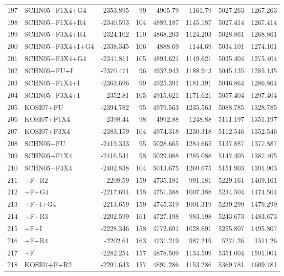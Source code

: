 \begin{longtable}{clrrrrrr}
	197 & SCHN05+F1X4+G4 & -2353.895 & 99 & 4905.79 & 1161.79 & 5027.263 & 1267.263 \\ 
	198 & SCHN05+F1X4+R4 & -2340.593 & 104 & 4889.187 & 1145.187 & 5027.414 & 1267.414 \\ 
	199 & SCHN05+F3X4+R4 & -2324.102 & 110 & 4868.203 & 1124.203 & 5028.861 & 1268.861 \\ 
	200 & SCHN05+F3X4+I+G4 & -2338.345 & 106 & 4888.69 & 1144.69 & 5034.101 & 1274.101 \\ 
	201 & SCHN05+F3X4+G4 & -2341.811 & 105 & 4893.621 & 1149.621 & 5035.404 & 1275.404 \\ 
	202 & SCHN05+FU+I & -2370.471 & 96 & 4932.943 & 1188.943 & 5045.135 & 1285.135 \\ 
	203 & SCHN05+F1X4+I & -2363.696 & 99 & 4925.391 & 1181.391 & 5046.864 & 1286.864 \\ 
	204 & SCHN05+F3X4+I & -2352.81 & 105 & 4915.621 & 1171.621 & 5057.404 & 1297.404 \\ 
	205 & KOSI07+FU & -2394.782 & 95 & 4979.563 & 1235.563 & 5088.785 & 1328.785 \\ 
	206 & KOSI07+F1X4 & -2398.44 & 98 & 4992.88 & 1248.88 & 5111.197 & 1351.197 \\ 
	207 & KOSI07+F3X4 & -2383.159 & 104 & 4974.318 & 1230.318 & 5112.546 & 1352.546 \\ 
	208 & SCHN05+FU & -2419.333 & 95 & 5028.665 & 1284.665 & 5137.887 & 1377.887 \\ 
	209 & SCHN05+F1X4 & -2416.544 & 98 & 5029.088 & 1285.088 & 5147.405 & 1387.405 \\ 
	210 & SCHN05+F3X4 & -2402.838 & 104 & 5013.675 & 1269.675 & 5151.903 & 1391.903 \\ 
	211 & \gy+F+R2 & -2208.59 & 159 & 4735.181 & 991.181 & 5229.161 & 1469.161 \\ 
	212 & \gy+F+G4 & -2217.694 & 158 & 4751.388 & 1007.388 & 5234.504 & 1474.504 \\ 
	213 & \gy+F+I+G4 & -2213.659 & 159 & 4745.319 & 1001.319 & 5239.299 & 1479.299 \\ 
	214 & \gy+F+R3 & -2202.599 & 161 & 4727.198 & 983.198 & 5243.673 & 1483.673 \\ 
	215 & \gy+F+I & -2228.346 & 158 & 4772.691 & 1028.691 & 5255.807 & 1495.807 \\ 
	216 & \gy+F+R4 & -2202.61 & 163 & 4731.219 & 987.219 & 5271.26 & 1511.26 \\ 
	217 & \gy+F & -2282.254 & 157 & 4878.509 & 1134.509 & 5351.004 & 1591.004 \\ 
	218 & KOSI07+F+R2 & -2291.643 & 157 & 4897.286 & 1153.286 & 5369.781 & 1609.781 \\ 

\end{longtable}
